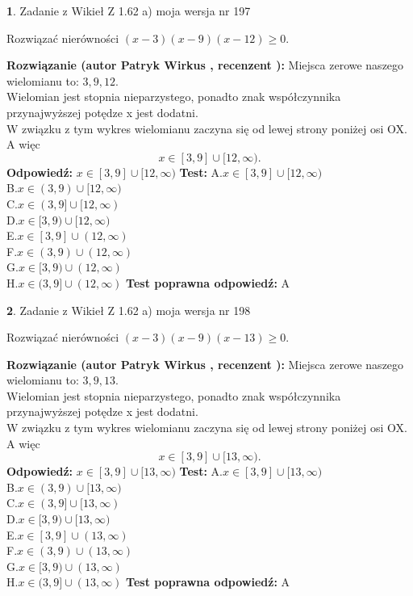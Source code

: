 \documentclass[12pt, a4paper]{article}
\theoremstyle{definition} %
\newtheorem{zad}{}
\newcommand{\zadStart}[1]{\begin{zad}#1\newline}
\newcommand{\zadStop}{\end{zad}}
\newcommand{\rozwStart}[2]{\noindent \textbf{Rozwiązanie (autor #1 , recenzent #2): }\newline}
\newcommand{\rozwStop}{\newline}
\newcommand{\odpStart}{\noindent \textbf{Odpowiedź:}\newline}
\newcommand{\odpStop}{\newline}
\newcommand{\testStart}{\noindent \textbf{Test:}\newline}
\newcommand{\testStop}{\newline}
\newcommand{\kluczStart}{\noindent \textbf{Test poprawna odpowiedź:}\newline}
\newcommand{\kluczStop}{\newline}
\begin{document}
\zadStart{Zadanie z Wikieł Z 1.62 a) moja wersja nr 197}

Rozwiązać nierówności $(x-3)(x-9)(x-12)\ge0$.
\zadStop
\rozwStart{Patryk Wirkus}{}
Miejsca zerowe naszego wielomianu to: $3, 9, 12$.\\
Wielomian jest stopnia nieparzystego, ponadto znak współczynnika przy\linebreak najwyższej potędze x jest dodatni.\\ W związku z tym wykres wielomianu zaczyna się od lewej strony poniżej osi OX. A więc $$x \in [3,9] \cup [12,\infty).$$
\rozwStop
\odpStart
$x \in [3,9] \cup [12,\infty)$
\odpStop
\testStart
A.$x \in [3,9] \cup [12,\infty)$\\
B.$x \in (3,9) \cup [12,\infty)$\\
C.$x \in (3,9] \cup [12,\infty)$\\
D.$x \in [3,9) \cup [12,\infty)$\\
E.$x \in [3,9] \cup (12,\infty)$\\
F.$x \in (3,9) \cup (12,\infty)$\\
G.$x \in [3,9) \cup (12,\infty)$\\
H.$x \in (3,9] \cup (12,\infty)$
\testStop
\kluczStart
A
\kluczStop



\zadStart{Zadanie z Wikieł Z 1.62 a) moja wersja nr 198}

Rozwiązać nierówności $(x-3)(x-9)(x-13)\ge0$.
\zadStop
\rozwStart{Patryk Wirkus}{}
Miejsca zerowe naszego wielomianu to: $3, 9, 13$.\\
Wielomian jest stopnia nieparzystego, ponadto znak współczynnika przy\linebreak najwyższej potędze x jest dodatni.\\ W związku z tym wykres wielomianu zaczyna się od lewej strony poniżej osi OX. A więc $$x \in [3,9] \cup [13,\infty).$$
\rozwStop
\odpStart
$x \in [3,9] \cup [13,\infty)$
\odpStop
\testStart
A.$x \in [3,9] \cup [13,\infty)$\\
B.$x \in (3,9) \cup [13,\infty)$\\
C.$x \in (3,9] \cup [13,\infty)$\\
D.$x \in [3,9) \cup [13,\infty)$\\
E.$x \in [3,9] \cup (13,\infty)$\\
F.$x \in (3,9) \cup (13,\infty)$\\
G.$x \in [3,9) \cup (13,\infty)$\\
H.$x \in (3,9] \cup (13,\infty)$
\testStop
\kluczStart
A
\kluczStop
\end{document}
